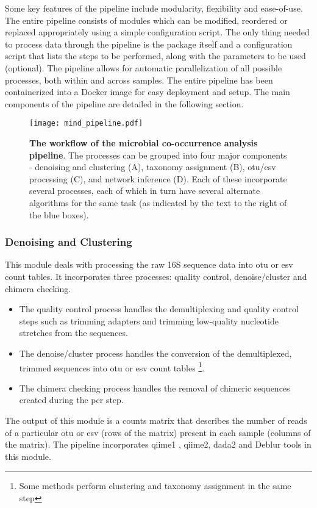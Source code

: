     Some key features of the pipeline include modularity, flexibility and ease-of-use.
    The entire pipeline consists of modules which can be modified, reordered or replaced appropriately using a simple configuration script.
    The only thing needed to process data through the pipeline is the package itself and a configuration script that lists the steps to be performed, along with the parameters to be used (optional).
    The pipeline allows for automatic parallelization of all possible processes, both within and across samples.
    The entire pipeline has been containerized into a Docker \cite{Merkel1994} image for easy deployment and setup.
    The main components of the pipeline are detailed in the following section.

    \begin{figure}[h]
      \centering
      \texttt{[image: mind\_pipeline.pdf]}
      \caption{
        \textbf{The workflow of the microbial co-occurrence analysis pipeline}.
          The processes can be grouped into four major components - denoising and clustering (A), taxonomy assignment (B), \ac{otu}/\ac{esv} processing (C), and network inference (D).
          Each of these incorporate several processes, each of which in turn have several alternate algorithms for the same task (as indicated by the text to the right of the blue boxes).
      }
      \label{fig:mind_pipeline}
    \end{figure}

    \subsubsection*{Denoising and Clustering}
      \vspace{-5mm}
      This module deals with processing the raw 16S sequence data into \ac{otu} or \ac{esv} count tables.
      It incorporates three processes: quality control, denoise/cluster and chimera checking.
      \begin{itemize}
        \item The quality control process handles the demultiplexing and quality control steps such as trimming adapters and trimming low-quality nucleotide stretches from the sequences.
        \item The denoise/cluster process handles the conversion of the demultiplexed, trimmed sequences into \ac{otu} or \ac{esv} count tables \footnote{Some methods perform clustering and taxonomy assignment in the same step}.
        \item The chimera checking process handles the removal of chimeric sequences created during the \ac{pcr} step.
      \end{itemize}
      The output of this module is a counts matrix that describes the number of reads of a particular \ac{otu} or \ac{esv} (rows of the matrix) present in each sample (columns of the matrix). The pipeline incorporates \ac{qiime1} \cite{Caporaso2010}, \ac{qiime2}, \ac{dada2} \cite{Callahan2016} and Deblur \cite{Amir2017} tools in this module.

